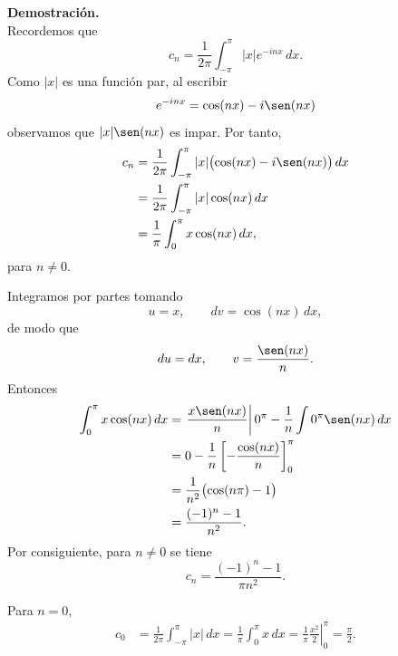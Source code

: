 \documentclass[11pt,letterpaper]{article}
\newcommand{\dd}{\,dx}
\begin{document}
\textbf{Demostración.}\,\\
Recordemos que
\begin{equation*}
    c_n=\frac{1}{2\pi}\int_{-\pi}^{\pi}|x|e^{-inx}\dd.
\end{equation*}
Como $|x|$ es una función par, al escribir
\begin{equation*}
    e^{-inx}=\cos(nx)-i\sen(nx)
\end{equation*}
observamos que $|x|\sen(nx)$ es impar. Por tanto,
\begin{align*}
    c_n
    &=\frac{1}{2\pi}\int_{-\pi}^{\pi}|x|\bigl(\cos(nx)-i\sen(nx)\bigr)\dd \\
    &=\frac{1}{2\pi}\int_{-\pi}^{\pi}|x|\cos(nx)\dd \\
    &=\frac{1}{\pi}\int_{0}^{\pi}x\cos(nx)\dd,
\end{align*}
para $n\neq 0$.

Integramos por partes tomando
\begin{equation*}
    u=x,\qquad dv=\cos(nx)\,dx,
\end{equation*}
de modo que
\begin{equation*}
    du=dx,\qquad v=\frac{\sen(nx)}{n}.
\end{equation*}
Entonces
\begin{align*}
    \int_{0}^{\pi}x\cos(nx)\dd
    &=\left.\frac{x\sen(nx)}{n}\right|{0}^{\pi}-\frac{1}{n}\int{0}^{\pi}\sen(nx)\dd \\
    &=0-\frac{1}{n}\left[-\frac{\cos(nx)}{n}\right]_{0}^{\pi} \\
    &=\frac{1}{n^2}\bigl(\cos(n\pi)-1\bigr) \\
    &=\frac{(-1)^n-1}{n^2}.
\end{align*}
Por consiguiente, para $n\neq 0$ se tiene
\begin{equation*}
    c_n=\frac{(-1)^n-1}{\pi n^2}.
\end{equation*}

Para $n=0$,
\begin{align*}
    c_0
    &=\frac{1}{2\pi}\int_{-\pi}^{\pi}|x|\dd
    =\frac{1}{\pi}\int_{0}^{\pi}x\dd
    =\frac{1}{\pi}\left.\frac{x^2}{2}\right|_{0}^{\pi}
    =\frac{\pi}{2}.
\end{align*}
\end{document}
